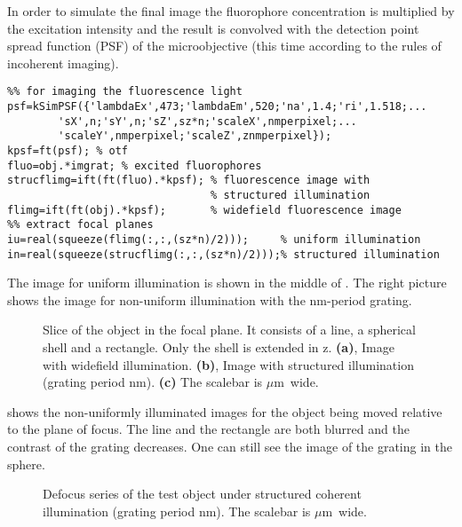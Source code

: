 In order to simulate the final image the fluorophore concentration is
multiplied by the excitation intensity and the result is convolved
with the detection point spread function (PSF)
  of the microobjective (this time according to the
rules of incoherent imaging).
\begin{lstlisting}
%% for imaging the fluorescence light
psf=kSimPSF({'lambdaEx',473;'lambdaEm',520;'na',1.4;'ri',1.518;...
        'sX',n;'sY',n;'sZ',sz*n;'scaleX',nmperpixel;...
        'scaleY',nmperpixel;'scaleZ',znmperpixel});
kpsf=ft(psf); % otf
fluo=obj.*imgrat; % excited fluorophores
strucflimg=ift(ft(fluo).*kpsf); % fluorescence image with 
                                % structured illumination
flimg=ift(ft(obj).*kpsf);       % widefield fluorescence image
%% extract focal planes
iu=real(squeeze(flimg(:,:,(sz*n)/2)));     % uniform illumination
in=real(squeeze(strucflimg(:,:,(sz*n)/2)));% structured illumination
\end{lstlisting}
The image for uniform illumination is shown in the middle of
. The right picture shows the image for non-uniform
illumination with the \unit[600]{nm}-period grating.
\begin{figure}[htb]
  \centering
  \caption{Slice of the object in the focal plane. It consists of a
    line, a spherical shell and a rectangle. Only the shell is
    extended in z. {\bf(a)}, Image with widefield
    illumination. {\bf(b)}, Image with structured illumination
    (grating period \unit[600]{nm}). {\bf(c)} The scalebar is
    \unit[2]{$\mu$m} wide. }
  \label{fig:input}
\end{figure}
 shows the non-uniformly illuminated images for
the object being moved relative to the plane of focus. The line and
the rectangle are both blurred and the contrast of the grating
decreases. One can still see the image of the grating in the sphere.
\begin{figure}[htb]
  \centering
  \caption{Defocus series of the test object under structured coherent
    illumination (grating period \unit[600]{nm}). The scalebar is
    \unit[2]{$\mu$m} wide.}
  \label{fig:defocus}
\end{figure}
